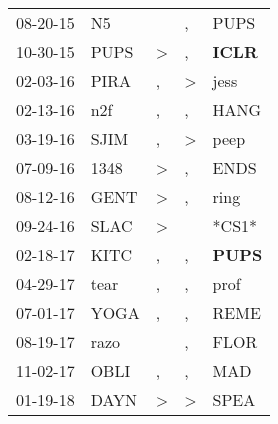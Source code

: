 \begin{supertabular}{p{0.07\textwidth}p{0.06\textwidth}p{0.02\textwidth}p{0.02\textwidth}p{0.06\textwidth}}
          08-20-15\textsuperscript{} &             N5\textsuperscript{} &                  &                , &           PUPS\textsuperscript{} \\
          10-30-15\textsuperscript{} &           PUPS\textsuperscript{} &     \textgreater &                , &  \textbf{ICLR\textsuperscript{}} \\
          02-03-16\textsuperscript{} &           PIRA\textsuperscript{} &                , &     \textgreater &           jess\textsuperscript{} \\
          02-13-16\textsuperscript{} &            n2f\textsuperscript{} &                , &                , &           HANG\textsuperscript{} \\
          03-19-16\textsuperscript{} &           SJIM\textsuperscript{} &                , &     \textgreater &           peep\textsuperscript{} \\
          07-09-16\textsuperscript{} &           1348\textsuperscript{} &     \textgreater &                , &           ENDS\textsuperscript{} \\
          08-12-16\textsuperscript{} &           GENT\textsuperscript{} &     \textgreater &                , &           ring\textsuperscript{} \\
          09-24-16\textsuperscript{} &           SLAC\textsuperscript{} &     \textgreater &                  &                            *CS1* \\
          02-18-17\textsuperscript{} &           KITC\textsuperscript{} &                , &                , &  \textbf{PUPS\textsuperscript{}} \\
          04-29-17\textsuperscript{} &           tear\textsuperscript{} &                , &                , &           prof\textsuperscript{} \\
          07-01-17\textsuperscript{} &           YOGA\textsuperscript{} &                , &                , &           REME\textsuperscript{} \\
          08-19-17\textsuperscript{} &           razo\textsuperscript{} &                  &                , &           FLOR\textsuperscript{} \\
          11-02-17\textsuperscript{} &           OBLI\textsuperscript{} &                , &                , &            MAD\textsuperscript{} \\
          01-19-18\textsuperscript{} &           DAYN\textsuperscript{} &     \textgreater &     \textgreater &           SPEA\textsuperscript{} \\

\end{supertabular}
